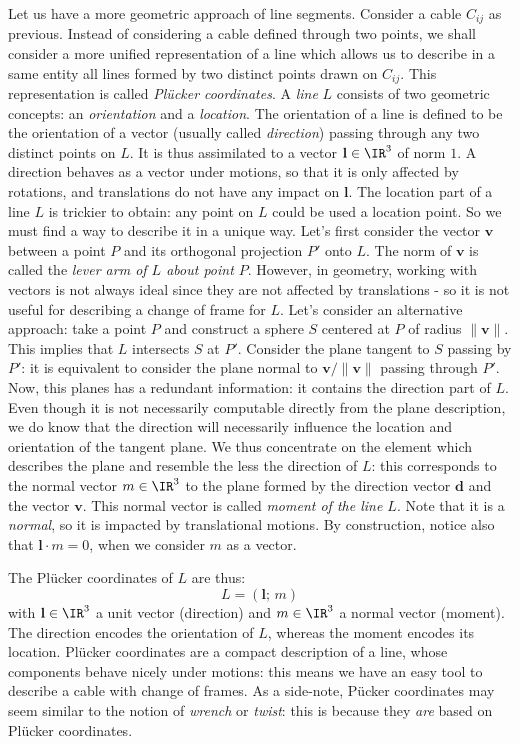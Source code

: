 Let us have a more geometric approach of line segments. Consider a cable $C_{ij}$ as previous. Instead of considering a cable defined through two points, we shall consider a more unified representation of a line which allows us to describe in a same entity all lines formed by two distinct points drawn on $C_{ij}$. This representation is called \emph{Plücker coordinates}. A \emph{line} $L$ consists of two geometric concepts: an \emph{orientation} and a \emph{location}. The orientation of a line is defined to be the orientation of a vector (usually called \emph{direction}) passing through any two distinct points on $L$. It is thus assimilated to a vector $\mathbf{l}\in\IR^3$ of norm $1$. A direction behaves as a vector under motions, so that it is only affected by rotations, and translations do not have any impact on $\mathbf{l}$. The location part of a line $L$ is trickier to obtain: any point on $L$ could be used a location point. So we must find a way to describe it in a unique way. Let's first consider the vector $\mathbf{v}$ between a point $P$ and its orthogonal projection $P'$ onto $L$. The norm of $\mathbf{v}$ is called the \emph{lever arm of $L$ about point $P$}. However, in geometry, working with vectors is not always ideal since they are not affected by translations - so it is not useful for describing a change of frame for $L$. Let's consider an alternative approach: take a point $P$ and construct a sphere $S$ centered at $P$ of radius $\| \mathbf{v} \|$. This implies that $L$ intersects $S$ at $P'$. Consider the plane tangent to $S$ passing by $P'$: it is equivalent to consider the plane normal to $\mathbf{v} / \| \mathbf{v} \|$ passing through $P'$. Now, this planes has a redundant information: it contains the direction part of $L$. Even though it is not necessarily computable directly from the plane description, we do know that the direction will necessarily influence the location and orientation of the tangent plane. We thus concentrate on the element which describes the plane and resemble the less the direction of $L$: this corresponds to the normal vector $m\in\IR^3$ to the plane formed by the direction vector $\mathbf{d}$ and the vector $\mathbf{v}$. This normal vector is called \emph{moment of the line $L$}. Note that it is a \emph{normal}, so it is impacted by translational motions. By construction, notice also that $\mathbf{l} \cdot m = 0$, when we consider $m$ as a vector.

The Plücker coordinates of $L$ are thus:
$$L = (\mathbf{l};\, m)$$
with $\mathbf{l}\in\IR^3$ a unit vector (direction) and $m\in\IR^3$ a normal vector (moment). The direction encodes the orientation of $L$, whereas the moment encodes its location. Plücker coordinates are a compact description of a line, whose components behave nicely under motions: this means we have an easy tool to describe a cable with change of frames. As a side-note, Pücker coordinates may seem similar to the notion of \emph{wrench} or \emph{twist}: this is because they \emph{are} based on Plücker coordinates.

